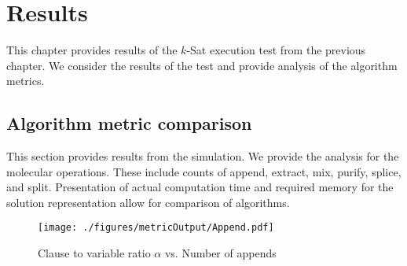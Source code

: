 \chapter{Results}

This chapter provides results of the $k$-{\sc Sat} execution test from the previous chapter.  We consider the results of the test and provide analysis of the algorithm metrics.  

	\section{Algorithm metric comparison}
	
This section provides results from the simulation.  We provide the analysis for the molecular operations.  These include counts of append, extract, mix, purify, splice, and split.  Presentation of actual computation time and required memory for the solution representation allow for comparison of algorithms.

\FloatBarrier
		

\begin{figure}[htdp]


\begin{center}

\texttt{[image: ./figures/metricOutput/Append.pdf]}

\caption{Clause to variable ratio $\alpha$ vs. Number of appends }
\label{appendFig}
\end{center}
\end{figure}

\FloatBarrier
			
